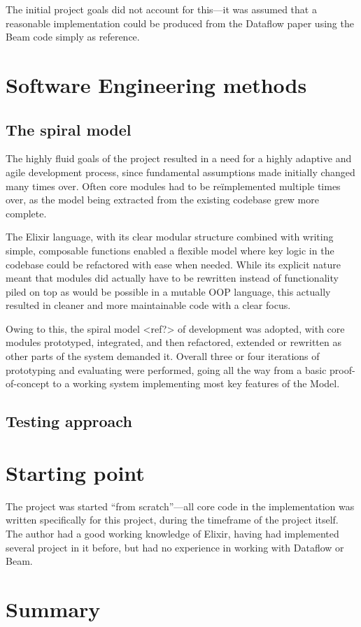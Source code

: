 The initial project goals did not account for this---it was assumed that a reasonable implementation could be produced from the Dataflow paper \cite{Akidau:2015} using the Beam code simply as reference.


\section{Software Engineering methods}\label{sec:prep:softeng}

\subsection{The spiral model}

The highly fluid goals of the project resulted in a need for a highly adaptive and agile development process, since fundamental assumptions made initially changed many times over.
Often core modules had to be re\"implemented multiple times over, as the model being extracted from the existing codebase grew more complete.

The Elixir language, with its clear modular structure combined with writing simple, composable functions enabled a flexible model where key logic in the codebase could be refactored with ease when needed.
While its explicit nature meant that modules did actually have to be rewritten instead of functionality piled on top as would be possible in a mutable OOP language, this actually resulted in cleaner and more maintainable code with a clear focus.

Owing to this, the spiral model <ref?> of development was adopted, with core modules prototyped, integrated, and then refactored, extended or rewritten as other parts of the system demanded it.
Overall three or four iterations of prototyping and evaluating were performed, going all the way from a basic proof-of-concept to a working system implementing most key features of the Model.


\subsection{Testing approach}


\section{Starting point}\label{sec:prep:starting}

The project was started ``from scratch''---all core code in the implementation was written specifically for this project, during the timeframe of the project itself.
The author had a good working knowledge of Elixir, having had implemented several project in it before, but had no experience in working with Dataflow or Beam.

\section{Summary}\label{sec:prep:summary}

